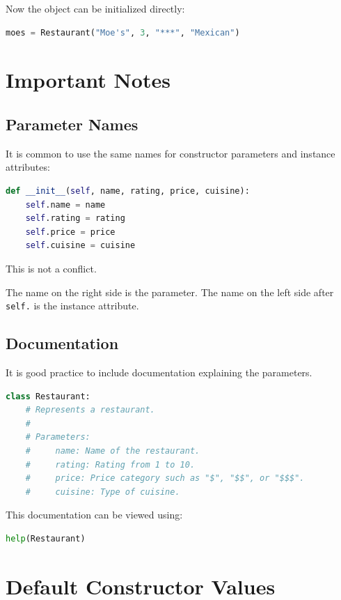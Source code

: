 \documentclass[11pt]{article}
\begin{document}
Now the object can be initialized directly:

\begin{lstlisting}[language=Python]
moes = Restaurant("Moe's", 3, "***", "Mexican")
\end{lstlisting}

\section{Important Notes}

\subsection{Parameter Names}

It is common to use the same names for constructor parameters and instance attributes:

\begin{lstlisting}[language=Python]
def __init__(self, name, rating, price, cuisine):
    self.name = name
    self.rating = rating
    self.price = price
    self.cuisine = cuisine
\end{lstlisting}

This is not a conflict.

The name on the right side is the parameter. The name on the left side after \verb|self.| is the instance attribute.

\subsection{Documentation}

It is good practice to include documentation explaining the parameters.

\begin{lstlisting}[language=Python]
class Restaurant:
    # Represents a restaurant.
    #
    # Parameters:
    #     name: Name of the restaurant.
    #     rating: Rating from 1 to 10.
    #     price: Price category such as "$", "$$", or "$$$".
    #     cuisine: Type of cuisine.
\end{lstlisting}

This documentation can be viewed using:

\begin{lstlisting}[language=Python]
help(Restaurant)
\end{lstlisting}

\section{Default Constructor Values}
\end{document}

